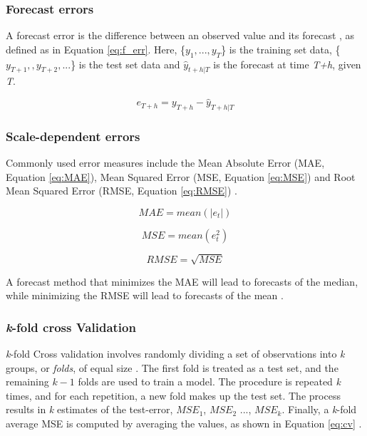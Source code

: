 \subsubsection{Forecast errors}
A forecast error is the difference between an observed value and its forecast \citep{Hyndman}, as defined as in Equation \ref{eq:f_err}. Here, \{$ y_{1},...,y_{T} $\} is the training set data, \{$ y_{T+1},,y_{T+2},...$\} is the test set data and $\hat{y}_{t+h|T}$ is the forecast at time \textit{T+h}, given \textit{T}. 

\begin{equation}\label{eq:f_err}
    e_{T+h} = y_{T+h} - \hat{y}_{T+h|T}
\end{equation}

\subsubsection{Scale-dependent errors}

Commonly used error measures include the Mean Absolute Error (MAE, Equation \ref{eq:MAE}), Mean Squared Error (MSE, Equation \ref{eq:MSE}) and Root Mean Squared Error (RMSE, Equation \ref{eq:RMSE}) \citep{Hyndman}.

\begin{equation}\label{eq:MAE}
    MAE = mean(|e_t|)
\end{equation}

\begin{equation}\label{eq:MSE}
    MSE = mean(e_t^2)
\end{equation}

\begin{equation}\label{eq:RMSE}
    RMSE = \sqrt{MSE}
\end{equation}


 A forecast method that minimizes the MAE will lead to forecasts of the median, while minimizing the RMSE will lead to forecasts of the mean \citep{Hyndman}. 

\subsubsection{\textit{k}-fold cross Validation}
\textit{k}-fold Cross validation involves randomly dividing a set of observations into \textit{k} groups, or \textit{folds}, of equal size \citep{ISLR}. The first fold is treated as a test set, and the remaining $k-1$ folds are used to train a model. The procedure is repeated \textit{k} times, and for each repetition, a new fold makes up the test set. The process results in \textit{k} estimates of the test-error, $MSE_1$, $MSE_2$ ..., $MSE_k$. Finally, a \textit{k}-fold average MSE is computed by averaging the values, as shown in Equation \ref{eq:cv} \citep{ISLR}.

